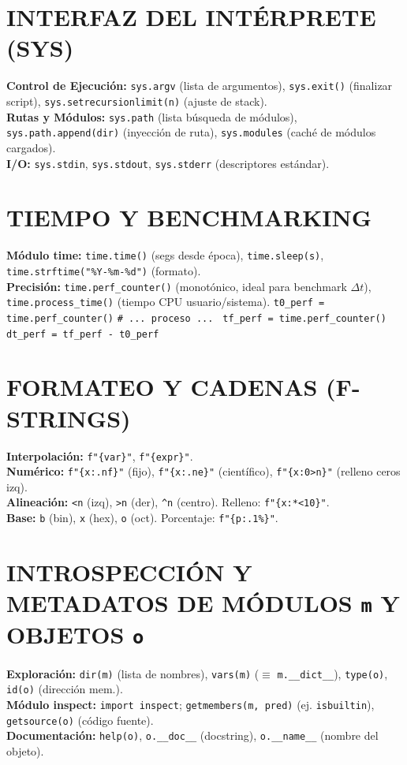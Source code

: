 \section{INTERFAZ DEL INTÉRPRETE (SYS)}
\textbf{Control de Ejecución:} \texttt{sys.argv} (lista de argumentos), \texttt{sys.exit()} (finalizar script), \texttt{sys.setrecursionlimit(n)} (ajuste de stack).\\
\textbf{Rutas y Módulos:} \texttt{sys.path} (lista búsqueda de módulos), \texttt{sys.path.append(dir)} (inyección de ruta), \texttt{sys.modules} (caché de módulos cargados).\\
\textbf{I/O:} \texttt{sys.stdin}, \texttt{sys.stdout}, \texttt{sys.stderr} (descriptores estándar).

\section{TIEMPO Y BENCHMARKING}
\textbf{Módulo time:} \texttt{time.time()} (segs desde época), \texttt{time.sleep(s)}, \texttt{time.strftime("\%Y-\%m-\%d")} (formato).\\
\textbf{Precisión:} \texttt{time.perf\_counter()} (monotónico, ideal para benchmark $\Delta t$), \texttt{time.process\_time()} (tiempo CPU usuario/sistema). \verb|t0_perf = time.perf_counter()|
\texttt{\# ... proceso ... }
\verb|tf_perf = time.perf_counter()|
\verb|dt_perf = tf_perf - t0_perf|



\section{FORMATEO Y CADENAS (F-STRINGS)}
\textbf{Interpolación:} \texttt{f"\{var\}"}, \texttt{f"\{expr\}"}.\\
\textbf{Numérico:} \texttt{f"\{x:.nf\}"} (fijo), \texttt{f"\{x:.ne\}"} (científico), \texttt{f"\{x:0>n\}"} (relleno ceros izq).\\
\textbf{Alineación:} \texttt{<n} (izq), \texttt{>n} (der), \verb|^n| (centro). Relleno: \texttt{f"\{x:*<10\}"}.\\
\textbf{Base:} \texttt{b} (bin), \texttt{x} (hex), \texttt{o} (oct). Porcentaje: \texttt{f"\{p:.1\%\}"}.

\section{INTROSPECCIÓN Y METADATOS DE MÓDULOS \texttt{m} Y OBJETOS \texttt{o}}
\textbf{Exploración:} \texttt{dir(m)} (lista de nombres), \texttt{vars(m)} ($\equiv$ \texttt{m.\_\_dict\_\_}), \texttt{type(o)}, \texttt{id(o)} (dirección mem.). \\
\textbf{Módulo inspect:} \texttt{import inspect}; \texttt{getmembers(m, pred)} (ej. \texttt{isbuiltin}), \texttt{getsource(o)} (código fuente). \\
\textbf{Documentación:} \texttt{help(o)}, \texttt{o.\_\_doc\_\_} (docstring), \texttt{o.\_\_name\_\_} (nombre del objeto).

